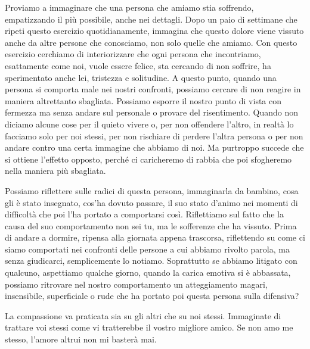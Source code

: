 \documentclass[12pt]{book} %
\begin{document}
Proviamo a immaginare che una persona che amiamo stia soffrendo, empatizzando il più possibile, anche nei dettagli. Dopo
un paio di settimane che ripeti questo esercizio quotidianamente, immagina che questo dolore viene vissuto anche da
altre persone che conosciamo, non solo quelle che amiamo. Con questo esercizio cerchiamo di interiorizzare che ogni
persona che incontriamo, esattamente come noi, vuole essere felice, sta cercando di non soffrire, ha sperimentato anche
lei, tristezza e solitudine. A questo punto, quando una persona si comporta male nei nostri confronti, possiamo cercare
di non reagire in maniera altrettanto sbagliata. Possiamo esporre il nostro punto di vista con fermezza ma senza andare
sul personale o provare del risentimento. Quando non diciamo alcune cose per il quieto vivere o, per non offendere
l'altro, in realtà lo facciamo solo per noi stessi, per non rischiare di perdere l'altra persona o per non andare
contro una certa immagine che abbiamo di noi. Ma purtroppo succede che si ottiene l'effetto opposto, perché ci
caricheremo di rabbia che poi sfogheremo nella maniera più sbagliata.

Possiamo riflettere sulle radici di questa persona, immaginarla da bambino, cosa gli è stato insegnato,
cos'ha dovuto passare, il suo stato d'animo nei momenti di difficoltà che poi
l'ha portato a comportarsi così. Riflettiamo sul fatto che la causa del suo comportamento non sei
tu, ma le sofferenze che ha vissuto. Prima di andare a dormire, ripensa alla giornata appena trascorsa, riflettendo su
come ci siamo comportati nei confronti delle persone a cui abbiamo rivolto parola, ma senza giudicarci, semplicemente
lo notiamo. Soprattutto se abbiamo litigato con qualcuno, aspettiamo qualche giorno, quando la carica emotiva si è
abbassata, possiamo ritrovare nel nostro comportamento un atteggiamento magari, insensibile, superficiale o rude che ha
portato poi questa persona sulla difensiva?

La compassione va praticata sia su gli altri che su noi stessi. Immaginate di trattare voi stessi come vi tratterebbe il
vostro migliore amico. Se non amo me stesso, l'amore altrui non mi basterà mai. 
\end{document}
